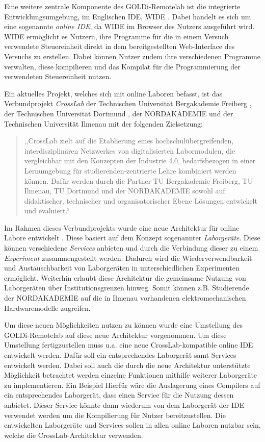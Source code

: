 Eine weitere zentrale Komponente des GOLDi-Remotelab ist die integrierte Entwicklungsumgebung, im Englischen \ac{IDE}, \ac{WIDE} \cite{henke_hidden_2021}. Dabei handelt es sich um eine sogenannte \textit{online IDE}, da WIDE im Browser des Nutzers ausgeführt wird. WIDE ermöglicht es Nutzern, ihre Programme für die in einem Versuch verwendete Steuereinheit direkt in dem bereitgestellten Web-Interface des Versuchs zu erstellen. Dabei können Nutzer zudem ihre verschiedenen Programme verwalten, diese kompilieren und das Kompilat für die Programmierung der verwendeten Steuereinheit nutzen.

Ein aktuelles Projekt, welches sich mit online Laboren befasst, ist das Verbundprojekt \textit{CrossLab} \cite{aubel_adaptable_2022} der Technischen Universität Bergakademie Freiberg \cite{noauthor_tu-freiberg_nodate}, der Technischen Universität Dortmund \cite{dortmund_tu-dortmund_nodate}, der NORDAKADEMIE \cite{noauthor_nordakademie_nodate} und der Technischen Universität Ilmenau mit der folgenden Zielsetzung:

\begin{quote}
    ,,CrossLab zielt auf die Etablierung eines hochschulübergreifenden, interdisziplinären Netzwerkes von digitalisierten Labormodulen, die vergleichbar mit den Konzepten der Industrie 4.0, bedarfsbezogen in einer Lernumgebung für studierenden-zentrierte Lehre kombiniert werden können. Dafür werden durch die Partner TU Bergakademie Freiberg, TU Ilmenau, TU Dortmund und der NORDAKADEMIE sowohl auf didaktischer, technischer und organisatorischer Ebene Lösungen entwickelt und evaluiert.`` \cite{noauthor_crosslab_nodate}
\end{quote}

Im Rahmen dieses Verbundprojekts wurde eine neue Architektur für online Labore entwickelt \cite{nau_new_2022}. Diese basiert auf dem Konzept sogenannter \textit{Laborgeräte}. Diese können verschiedene \textit{Services} anbieten und durch die Verbindung dieser zu einem \textit{Experiment} zusammengestellt werden. Dadurch wird die Wiederverwendbarkeit und Austauschbarkeit von Laborgeräten in unterschiedlichen Experimenten ermöglicht. Weiterhin erlaubt diese Architektur die gemeinsame Nutzung von Laborgeräten über Institutionsgrenzen hinweg. Somit können z.B. Studierende der NORDAKADEMIE auf die in Ilmenau vorhandenen elektromechanischen Hardwaremodelle zugreifen.

Um diese neuen Möglichkeiten nutzen zu können wurde eine Umstellung des GOLDi-Remotelab auf diese neue Architektur vorgenommen. Um diese Umstellung fertigzustellen muss u.a. eine neue CrossLab-kompatible online IDE entwickelt werden. Dafür soll ein entsprechendes Laborgerät samt Services entwickelt werden. Dabei soll auch die durch die neue Architektur unterstützte Möglichkeit betrachtet werden einzelne Funktionen mithilfe weiterer Laborgeräte zu implementieren. Ein Beispiel Hierfür wäre die Auslagerung eines Compilers auf ein entsprechendes Laborgerät, dass einen Service für die Nutzung dessen anbietet. Dieser Service könnte dann wiederum von dem Laborgerät der IDE verwendet werden um die Kompilierung für Nutzer bereitzustellen. Die entwickelten Laborgeräte und Services sollen in allen online Laboren nutzbar sein, welche die CrossLab-Architektur verwenden.

